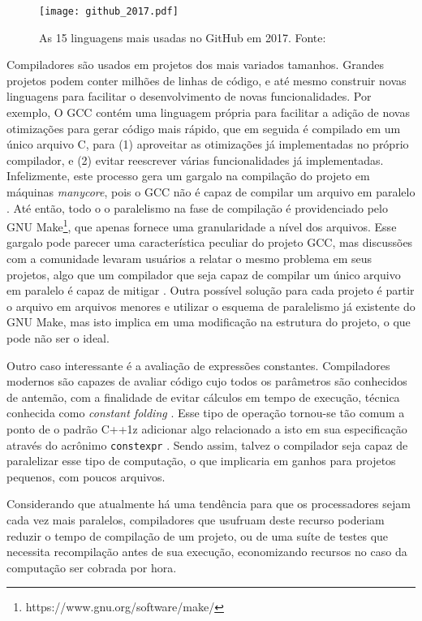 \begin{figure}[ht]
 \centering
 \texttt{[image: github\_2017.pdf]}
 \caption{As 15 linguagens mais usadas no GitHub em 2017. Fonte: \cite{githuboctoverse}}
 \label{fig:github_2017}
\end{figure}

Compiladores são usados em projetos dos mais variados tamanhos.
Grandes projetos podem conter milhões de linhas de código, e até mesmo
construir novas linguagens para facilitar o desenvolvimento de novas
funcionalidades. Por exemplo, O GCC contém uma linguagem própria para facilitar
a adição de novas otimizações para gerar código mais rápido, que em seguida é
compilado em um único arquivo C, para (1) aproveitar as otimizações já
implementadas no próprio compilador, e (2) evitar reescrever várias
funcionalidades já implementadas. Infelizmente, este processo
gera um gargalo na compilação do projeto em máquinas \textit{manycore}, pois o
GCC não é capaz de compilar um arquivo em paralelo \citep{pr84402}. Até então, todo o o
paralelismo na fase de compilação é providenciado pelo 
GNU Make\footnote{https://www.gnu.org/software/make/}, que apenas
fornece uma granularidade a nível dos arquivos. Esse gargalo pode parecer uma
característica peculiar do projeto GCC, mas discussões com a comunidade levaram
usuários a relatar o mesmo problema em seus projetos, algo que um compilador
que seja capaz de compilar um único arquivo em paralelo é capaz de mitigar
\citep{mailgcc} \citep{phoronix}. Outra possível solução para cada
projeto é partir o arquivo em arquivos menores e utilizar o esquema de
paralelismo já existente do GNU Make, mas isto implica em uma modificação na
estrutura do projeto, o que pode não ser o ideal.

Outro caso interessante é a avaliação de expressões constantes. Compiladores
modernos são capazes de avaliar código cujo todos os parâmetros são conhecidos
de antemão, com a finalidade de evitar cálculos em tempo de execução, técnica
conhecida como \textit{constant folding} \citep{dragonbook}. Esse tipo de
operação tornou-se tão comum a ponto de o padrão C++1z adicionar algo
relacionado a isto em sua especificação através do acrônimo \texttt{constexpr}
\citep{iso148822017}.
Sendo assim, talvez o compilador seja capaz de paralelizar esse tipo de
computação, o que implicaria em ganhos para projetos pequenos, com poucos
arquivos.

Considerando que atualmente há uma tendência para que os processadores sejam
cada vez mais paralelos, compiladores que usufruam deste recurso poderiam
reduzir o tempo de compilação de um projeto, ou de uma suíte de testes que
necessita recompilação antes de sua execução, economizando recursos no caso da
computação ser cobrada por hora.

